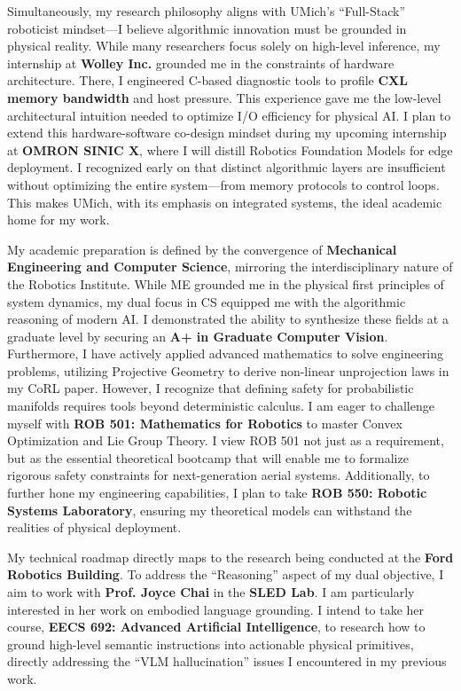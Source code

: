 \documentclass[11pt]{article}
\begin{document}
Simultaneously, my research philosophy aligns with UMich’s ``Full-Stack'' roboticist mindset—I believe algorithmic innovation must be grounded in physical reality. While many researchers focus solely on high-level inference, my internship at \textbf{Wolley Inc.} grounded me in the constraints of hardware architecture. There, I engineered C-based diagnostic tools to profile \textbf{CXL memory bandwidth} and host pressure. This experience gave me the low-level architectural intuition needed to optimize I/O efficiency for physical AI. I plan to extend this hardware-software co-design mindset during my upcoming internship at \textbf{OMRON SINIC X}, where I will distill Robotics Foundation Models for edge deployment. I recognized early on that distinct algorithmic layers are insufficient without optimizing the entire system—from memory protocols to control loops. This makes UMich, with its emphasis on integrated systems, the ideal academic home for my work.

My academic preparation is defined by the convergence of \textbf{Mechanical Engineering and Computer Science}, mirroring the interdisciplinary nature of the Robotics Institute. While ME grounded me in the physical first principles of system dynamics, my dual focus in CS equipped me with the algorithmic reasoning of modern AI. I demonstrated the ability to synthesize these fields at a graduate level by securing an \textbf{A+ in Graduate Computer Vision}. Furthermore, I have actively applied advanced mathematics to solve engineering problems, utilizing Projective Geometry to derive non-linear unprojection laws in my CoRL paper. However, I recognize that defining safety for probabilistic manifolds requires tools beyond deterministic calculus. I am eager to challenge myself with \textbf{ROB 501: Mathematics for Robotics} to master Convex Optimization and Lie Group Theory. I view ROB 501 not just as a requirement, but as the essential theoretical bootcamp that will enable me to formalize rigorous safety constraints for next-generation aerial systems. Additionally, to further hone my engineering capabilities, I plan to take \textbf{ROB 550: Robotic Systems Laboratory}, ensuring my theoretical models can withstand the realities of physical deployment.

My technical roadmap directly maps to the research being conducted at the \textbf{Ford Robotics Building}. To address the ``Reasoning'' aspect of my dual objective, I aim to work with \textbf{Prof. Joyce Chai} in the \textbf{SLED Lab}. I am particularly interested in her work on embodied language grounding. I intend to take her course, \textbf{EECS 692: Advanced Artificial Intelligence}, to research how to ground high-level semantic instructions into actionable physical primitives, directly addressing the ``VLM hallucination'' issues I encountered in my previous work.
\end{document}
